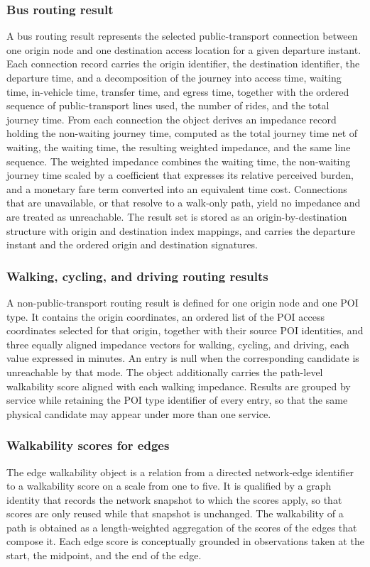 \documentclass{article}
\begin{document}
\subsubsection*{Bus routing result}
    A bus routing result represents the selected public-transport connection
    between one origin node and one destination access location for a given
    departure instant. Each connection record carries the origin identifier, the
    destination identifier, the departure time, and a decomposition of the journey
    into access time, waiting time, in-vehicle time, transfer time, and egress
    time, together with the ordered sequence of public-transport lines used, the
    number of rides, and the total journey time. From each connection the object derives an impedance record holding the non-waiting journey time, computed as the total journey time net of waiting, the waiting time, the resulting weighted impedance, and the same line sequence. The weighted impedance combines the waiting time, the non-waiting journey time scaled by a coefficient that expresses its relative perceived burden, and a monetary fare term converted into an equivalent time cost.  Connections that are unavailable, or that resolve to a walk-only path,
    yield no impedance and are treated as unreachable. The result set is stored as
    an origin-by-destination structure with origin and destination index mappings,
    and carries the departure instant and the ordered origin and destination
    signatures.

\subsubsection*{Walking, cycling, and driving routing results}
    A non-public-transport routing result is defined for one origin node and one
    POI type. It contains the origin coordinates, an ordered list of the POI access coordinates selected for that origin, together with their source POI identities, and three equally
    aligned impedance vectors for walking, cycling, and driving, each value
    expressed in minutes. An entry is null when the corresponding candidate is
    unreachable by that mode. The object additionally carries the path-level
    walkability score aligned with each walking impedance. Results are grouped by
    service while retaining the POI type identifier of every entry, so that the
    same physical candidate may appear under more than one service.

\subsubsection*{Walkability scores for edges}
    The edge walkability object is a relation from a directed network-edge
    identifier to a walkability score on a scale from one to five. It is qualified
    by a graph identity that records the network snapshot to which the scores
    apply, so that scores are only reused while that snapshot is unchanged. The
    walkability of a path is obtained as a length-weighted aggregation of the
    scores of the edges that compose it. Each edge score is conceptually grounded
    in observations taken at the start, the midpoint, and the end of the edge.
\end{document}
